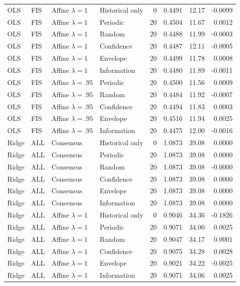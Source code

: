 \begin{longtable}{llllrrrr}
OLS & FIS & Affine $\lambda=1$ & Historical only & 0 & 0.4491 & 12.17 & -0.0099 \\
OLS & FIS & Affine $\lambda=1$ & Periodic & 20 & 0.4504 & 11.67 & 0.0012 \\
OLS & FIS & Affine $\lambda=1$ & Random & 20 & 0.4488 & 11.99 & -0.0003 \\
OLS & FIS & Affine $\lambda=1$ & Confidence & 20 & 0.4487 & 12.11 & -0.0005 \\
OLS & FIS & Affine $\lambda=1$ & Envelope & 20 & 0.4499 & 11.78 & 0.0008 \\
OLS & FIS & Affine $\lambda=1$ & Information & 20 & 0.4480 & 11.89 & -0.0011 \\
OLS & FIS & Affine $\lambda=.95$ & Periodic & 20 & 0.4500 & 11.56 & 0.0009 \\
OLS & FIS & Affine $\lambda=.95$ & Random & 20 & 0.4484 & 11.92 & -0.0007 \\
OLS & FIS & Affine $\lambda=.95$ & Confidence & 20 & 0.4494 & 11.83 & 0.0003 \\
OLS & FIS & Affine $\lambda=.95$ & Envelope & 20 & 0.4516 & 11.94 & 0.0025 \\
OLS & FIS & Affine $\lambda=.95$ & Information & 20 & 0.4475 & 12.00 & -0.0016 \\
Ridge & ALL & Consensus & Historical only & 0 & 1.0873 & 39.08 & 0.0000 \\
Ridge & ALL & Consensus & Periodic & 20 & 1.0873 & 39.08 & 0.0000 \\
Ridge & ALL & Consensus & Random & 20 & 1.0873 & 39.08 & -0.0000 \\
Ridge & ALL & Consensus & Confidence & 20 & 1.0873 & 39.08 & 0.0000 \\
Ridge & ALL & Consensus & Envelope & 20 & 1.0873 & 39.08 & 0.0000 \\
Ridge & ALL & Consensus & Information & 20 & 1.0873 & 39.08 & 0.0000 \\
Ridge & ALL & Affine $\lambda=1$ & Historical only & 0 & 0.9046 & 34.36 & -0.1826 \\
Ridge & ALL & Affine $\lambda=1$ & Periodic & 20 & 0.9071 & 34.00 & 0.0025 \\
Ridge & ALL & Affine $\lambda=1$ & Random & 20 & 0.9047 & 34.17 & 0.0001 \\
Ridge & ALL & Affine $\lambda=1$ & Confidence & 20 & 0.9075 & 34.28 & 0.0028 \\
Ridge & ALL & Affine $\lambda=1$ & Envelope & 20 & 0.9021 & 34.22 & -0.0025 \\
Ridge & ALL & Affine $\lambda=1$ & Information & 20 & 0.9071 & 34.06 & 0.0025 \\

\end{longtable}
